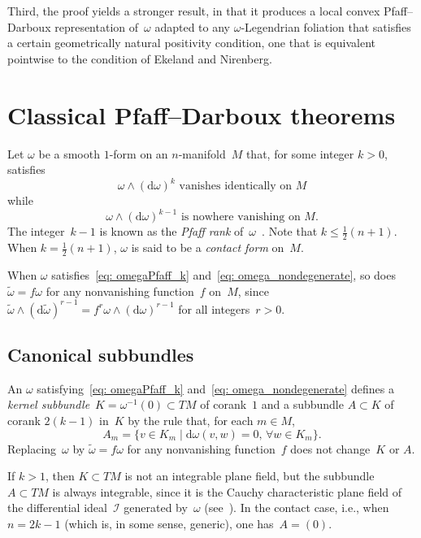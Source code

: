\documentclass[pdftex]{sigma}
\renewcommand{\d}{\mathrm{d}}%
\newcommand{\cI}{{\mathcal I}}
\newcommand{\w}{\wedge}
\numberwithin{equation}{section}
\begin{document}
Third, the proof yields a stronger result,
in that it produces a local convex Pfaff--Darboux representation
of~$\omega$ adapted to any $\omega$-Legendrian foliation
that satisfies a certain geometrically natural positivity condition,
one that is equivalent pointwise to the condition of Ekeland and Nirenberg.

\section{Classical Pfaff--Darboux theorems}
Let $\omega$ be a smooth $1$-form on an $n$-manifold~$M$
that, for some integer $k>0$, satisfies
\begin{equation}\label{eq: omegaPfaff_k}
\text{$\omega\w(\d\omega)^k$ vanishes identically on $M$}
\end{equation}
while
\begin{equation}\label{eq: omega_nondegenerate}
\text{$\omega\w(\d\omega)^{k-1}$ is nowhere vanishing on $M$.}
\end{equation}
The integer~$k{-}1$ is known as the \emph{Pfaff rank}
of~$\omega$~\cite[Chapter II, Section~3]{MR1083148}.
Note that $k\le \tfrac12(n{+}1)$. When $k=\tfrac12(n{+}1)$,
$\omega$ is said to be a \emph{contact form} on~$M$.

When $\omega$ satisfies~\eqref{eq: omegaPfaff_k}
and~\eqref{eq: omega_nondegenerate}, so does $\tilde\omega=f\omega$
for any nonvanishing function~$f$ on~$M$,
since $\tilde\omega\w(\d\tilde\omega)^{r-1} = f^r \omega\w(\d\omega)^{r-1}$
for all integers~$r>0$.

\subsection{Canonical subbundles}
An $\omega$ satisfying~\eqref{eq: omegaPfaff_k}
and~\eqref{eq: omega_nondegenerate} defines a \emph{kernel subbundle}~$K
= \omega^{-1}(0)\subset TM$ of corank~$1$
and a subbundle $A\subset K$ of corank $2(k{-}1)$ in~$K$
by the rule that, for each $m\in M$,
\begin{equation*}
A_m = \{ v\in K_m\mid \mathrm{d}\omega(v,w) = 0,\, \forall w\in K_m \}.
\end{equation*}
Replacing~$\omega$ by $\tilde\omega= f \omega$ for any nonvanishing
function~$f$ does not change~$K$ or $A$.

If $k>1$, then $K\subset TM$ is not an integrable plane field,
but the subbundle $A\subset TM$ is always integrable,
since it is the Cauchy characteristic plane field
of the differential ideal~$\cI$ generated by~$\omega$
(see~\cite[Chapter II, Proposition~2.1]{MR1083148}).
In the contact case, i.e., when $n=2k{-}1$ (which is,
in some sense, generic), one has~$A=(0)$.
\end{document}
